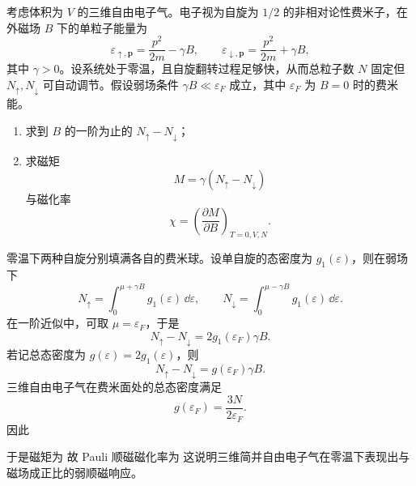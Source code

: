 \begin{question}
考虑体积为 $V$ 的三维自由电子气。电子视为自旋为 $1/2$ 的非相对论性费米子，在外磁场 $B$ 下的单粒子能量为
\[
\varepsilon_{\uparrow,\mathbf p}=\frac{p^2}{2m}-\gamma B,
\qquad
\varepsilon_{\downarrow,\mathbf p}=\frac{p^2}{2m}+\gamma B,
\]
其中 $\gamma>0$。设系统处于零温，且自旋翻转过程足够快，从而总粒子数 $N$ 固定但 $N_\uparrow,N_\downarrow$ 可自动调节。假设弱场条件 $\gamma B\ll \varepsilon_F$ 成立，其中 $\varepsilon_F$ 为 $B=0$ 时的费米能。

\begin{enumerate}[label=(\arabic*),leftmargin=2.5em]
  \item 求到 $B$ 的一阶为止的 $N_\uparrow-N_\downarrow$；
  \item 求磁矩
  \[
  M=\gamma(N_\uparrow-N_\downarrow)
  \]
  与磁化率
  \[
  \chi=\left(\frac{\partial M}{\partial B}\right)_{T=0,V,N}.
  \]
\end{enumerate}

\begin{solution}
零温下两种自旋分别填满各自的费米球。设单自旋的态密度为 $g_1(\varepsilon)$，则在弱场下
\[
N_\uparrow=\int_0^{\mu+\gamma B} g_1(\varepsilon)\,\dd{\varepsilon},
\qquad
N_\downarrow=\int_0^{\mu-\gamma B} g_1(\varepsilon)\,\dd{\varepsilon}.
\]
在一阶近似中，可取 $\mu=\varepsilon_F$，于是
\[
N_\uparrow-N_\downarrow=2g_1(\varepsilon_F)\gamma B.
\]
若记总态密度为 $g(\varepsilon)=2g_1(\varepsilon)$，则
\[
N_\uparrow-N_\downarrow=g(\varepsilon_F)\gamma B.
\]
三维自由电子气在费米面处的总态密度满足
\[
g(\varepsilon_F)=\frac{3N}{2\varepsilon_F}.
\]
因此

于是磁矩为
故 Pauli 顺磁磁化率为
这说明三维简并自由电子气在零温下表现出与磁场成正比的弱顺磁响应。
\end{solution}
\end{question}

